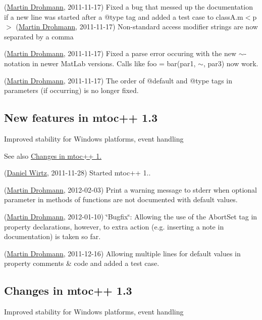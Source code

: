 \begin{DoxyRefList}
(\hyperlink{developers_md}{Martin Drohmann}, 2011-\/11-\/17) Fixed a bug that messed up the documentation if a new line was started after a @type tag and added a test case to class\+A.\+m$<$p$>$ (\hyperlink{developers_md}{Martin Drohmann}, 2011-\/11-\/17) Non-\/standard access modifier strings are now separated by a comma

(\hyperlink{developers_md}{Martin Drohmann}, 2011-\/11-\/17) Fixed a parse error occuring with the new $\sim$-\/notation in newer Mat\+Lab versions. Calls like {\ttfamily foo = bar(par1, $\sim$, par3)} now work.

(\hyperlink{developers_md}{Martin Drohmann}, 2011-\/11-\/17) The order of @default and @type tags in parameters (if occurring) is no longer fixed.
\end{DoxyRefList}\hypertarget{newfeat1_3}{}\subsection{New features in mtoc++ 1.3}\label{newfeat1_3}
Improved stability for Windows platforms, event handling

See also \hyperlink{changelog1_3}{Changes in mtoc++ 1.}


\begin{DoxyRefList}
\item[\label{newfeat1_3__newfeat1_3000004}%
\hypertarget{newfeat1_3__newfeat1_3000004}{}%
Page \hyperlink{changes}{Changes and new features in mtoc++} ](\hyperlink{developers_dw}{Daniel Wirtz}, 2011-\/11-\/28) Started mtoc++ 1.. 
\item[\label{newfeat1_3__newfeat1_3000001}%
\hypertarget{newfeat1_3__newfeat1_3000001}{}%
Class \hyperlink{class_m_file_scanner}{M\+File\+Scanner} ](\hyperlink{developers_md}{Martin Drohmann}, 2012-\/02-\/03) Print a warning message to stderr when optional parameter in methods of functions are not documented with default values.

(\hyperlink{developers_md}{Martin Drohmann}, 2012-\/01-\/10) \char`\"{}\+Bugfix\char`\"{}\+: Allowing the use of the {\ttfamily Abort\+Set} tag in property declarations, however, to extra action (e.\+g. inserting a note in documentation) is taken so far.

(\hyperlink{developers_md}{Martin Drohmann}, 2011-\/12-\/16) Allowing multiple lines for default values in property comments \& code and added a test case.
\end{DoxyRefList}\hypertarget{changelog1_3}{}\subsection{Changes in mtoc++ 1.3}\label{changelog1_3}
Improved stability for Windows platforms, event handling

